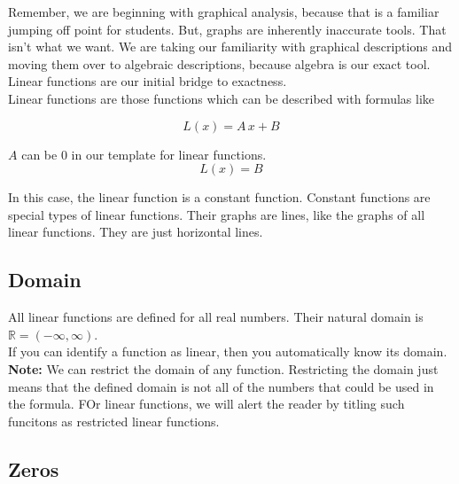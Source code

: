 \documentclass{ximera}
\begin{document}
Remember, we are beginning with graphical analysis, because that is a familiar jumping off point for students.  But, graphs are inherently inaccurate tools.  That isn't what we want. We are taking our familiarity with graphical descriptions and moving them over to algebraic descriptions, because algebra is our exact tool. \\

Linear functions are our initial bridge to exactness. \\


Linear functions are those functions which can be described with formulas like

\[
L(x) = A \, x + B 
\]



\begin{warning}

$A$ can be $0$ in our template for linear functions. \\

\[
L(x) = B 
\]

In this case, the linear function is a constant function.  Constant functions are special types of linear functions. Their graphs are lines, like the graphs of all linear functions.  They are just horizontal lines.

\end{warning}




\subsection*{Domain} 

All linear functions are defined for all real numbers.  Their natural domain is $\mathbb{R} = (-\infty, \infty)$. \\

If you can identify a function as linear, then you automatically know its domain. \\


\textbf{Note:}  We can restrict the domain of any function.  Restricting the domain just means that the defined domain is not all of the numbers that could be used in the formula.  FOr linear functions, we will alert the reader by titling such funcitons as restricted linear functions.\\







\subsection*{Zeros}
\end{document}
